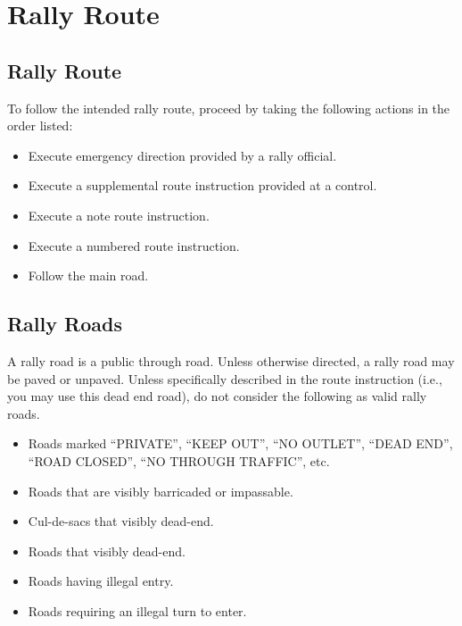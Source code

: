 \section{Rally Route}

\subsection{Rally Route}
To follow the intended rally route, proceed by taking the following actions in the order listed:

\begin{itemize}

\item Execute emergency direction provided by a rally official.

\item Execute a supplemental route instruction provided at a control.

\item Execute a note route instruction.

\item Execute a numbered route instruction.

\item Follow the main road.

\end{itemize}

\subsection{Rally Roads}
A rally road is a public through road.  Unless otherwise directed, a rally road may be paved or unpaved.  Unless specifically described in the route instruction (i.e., you may use this dead end road), do not consider the following as valid rally roads.

\begin{itemize}

\item Roads marked ``PRIVATE'', ``KEEP OUT'', ``NO OUTLET'', ``DEAD END'', ``ROAD CLOSED'', ``NO THROUGH TRAFFIC'', etc.

\item Roads that are visibly barricaded or impassable.

\item Cul-de-sacs that visibly dead-end.

\item Roads that visibly dead-end.

\item Roads having illegal entry.

\item Roads requiring an illegal turn to enter.

\end{itemize}

